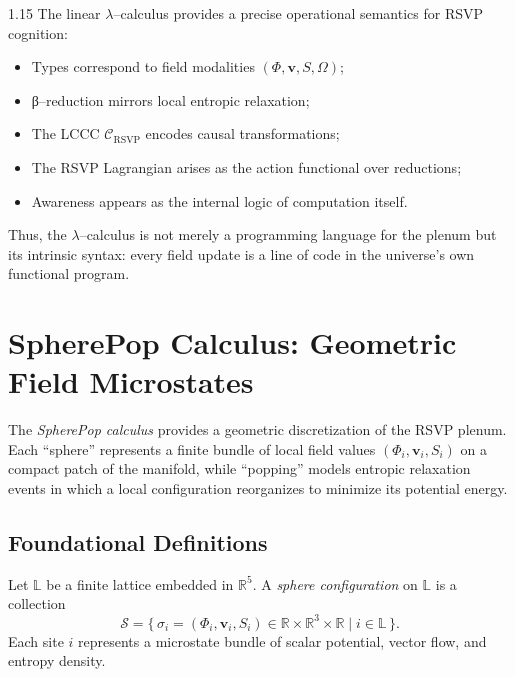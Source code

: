 \documentclass[12pt,a4paper]{article}
\begin{document}
\begin{spacing}{1.15}
The linear $\lambda$--calculus provides a precise operational semantics
for RSVP cognition:

\begin{itemize}[leftmargin=1.2em]
\item Types correspond to field modalities
      $(\Phi,\mathbf{v},S,\Omega)$;
\item β--reduction mirrors local entropic relaxation;
\item The LCCC $\mathcal{C}_{\mathrm{RSVP}}$ encodes causal transformations;
\item The RSVP Lagrangian arises as the action functional over reductions;
\item Awareness appears as the internal logic of computation itself.
\end{itemize}

Thus, the $\lambda$--calculus is not merely a programming language
for the plenum but its intrinsic syntax:
every field update is a line of code in the universe’s own
functional program.

\section{SpherePop Calculus: Geometric Field Microstates}
\label{sec:spherepop}

The \emph{SpherePop calculus} provides a geometric discretization of the RSVP plenum.
Each ``sphere'' represents a finite bundle of local field values
$(\Phi_i,\mathbf{v}_i,S_i)$ on a compact patch of the manifold,
while ``popping'' models entropic relaxation events in which
a local configuration reorganizes to minimize its potential energy.

\subsection{Foundational Definitions}

\begin{definition}
\label{def:sphere}
Let $\mathbb{L}$ be a finite lattice embedded in $\mathbb{R}^5$.
A \emph{sphere configuration} on $\mathbb{L}$ is a collection
\[
\mathcal{S} = \{\, \sigma_i = (\Phi_i,\mathbf{v}_i,S_i) \in \mathbb{R} \times \mathbb{R}^3 \times \mathbb{R} \;|\; i \in \mathbb{L} \,\}.
\]
Each site $i$ represents a microstate bundle of scalar potential,
vector flow, and entropy density.
\end{definition}


\end{spacing}
\end{document}
